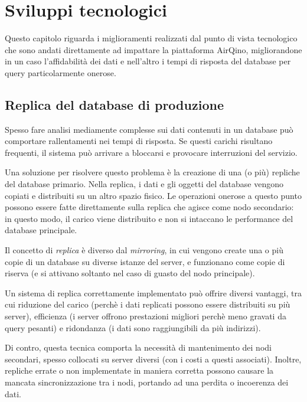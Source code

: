 \chapter{Sviluppi tecnologici}\label{ch:sviluppi}
Questo capitolo riguarda i miglioramenti realizzati dal punto di vista tecnologico che sono andati direttamente ad impattare la piattaforma AirQino, migliorandone in un caso l'affidabilità dei dati e nell'altro i tempi di risposta del database per query particolarmente onerose.

\section{Replica del database di produzione}\label{sec:replica}

Spesso fare analisi mediamente complesse sui dati contenuti in un database può comportare rallentamenti nei tempi di risposta. Se questi carichi risultano frequenti, il sistema può arrivare a bloccarsi e provocare interruzioni del servizio.

Una soluzione per risolvere questo problema è la creazione di una (o più) repliche del database primario. Nella replica, i dati e gli oggetti del database vengono copiati e distribuiti su un altro spazio fisico. Le operazioni onerose a questo punto possono essere fatte direttamente sulla replica che agisce come nodo secondario: in questo modo, il carico viene distribuito e non si intaccano le performance del database principale.

Il concetto di \textit{replica} è diverso dal \textit{mirroring}, in cui vengono create una o più copie di un database su diverse istanze del server, e funzionano come copie di riserva (e si attivano soltanto nel caso di guasto del nodo principale).

Un sistema di replica correttamente implementato può offrire diversi vantaggi, tra cui riduzione del carico (perchè i dati replicati possono essere distribuiti su più server), efficienza (i server offrono prestazioni migliori perchè meno gravati da query pesanti) e ridondanza (i dati sono raggiungibili da più indirizzi).

Di contro, questa tecnica comporta la necessità di mantenimento dei nodi secondari, spesso collocati su server diversi (con i costi a questi associati). Inoltre, repliche errate o non implementate in maniera corretta possono causare la mancata sincronizzazione tra i nodi, portando ad una perdita o incoerenza dei dati.

